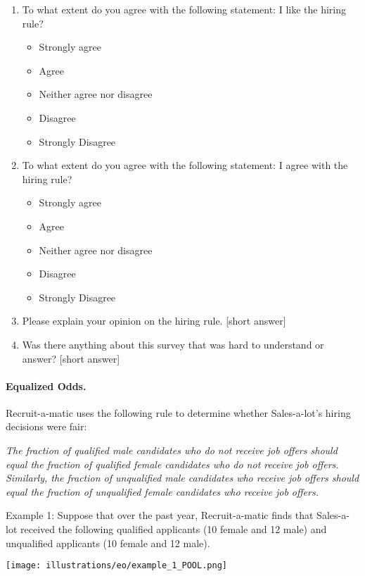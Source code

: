 \documentclass{article}
\begin{document}
\begin{enumerate}
\item To what extent do you agree with the following statement: I like the hiring rule?
\begin{itemize}
    \item Strongly agree
    \item Agree
    \item Neither agree nor disagree
    \item Disagree
    \item Strongly Disagree
\end{itemize}

\item To what extent do you agree with the following statement: I agree with the hiring rule?
\begin{itemize}
    \item Strongly agree
    \item Agree
    \item Neither agree nor disagree
    \item Disagree
    \item Strongly Disagree
\end{itemize}

\item Please explain your opinion on the hiring rule. [short answer]

\item Was there anything about this survey that was hard to understand or answer? [short answer]

\end{enumerate}

\paragraph{Equalized Odds.}
Recruit-a-matic uses the following rule to determine whether Sales-a-lot’s hiring decisions were fair:
 
\emph{The fraction of qualified male candidates who do not receive job offers should equal the fraction of qualified female candidates who do not receive job offers. Similarly, the fraction of unqualified male candidates who receive job offers should equal the fraction of unqualified female candidates who receive job offers.}

Example 1: Suppose that over the past year, Recruit-a-matic finds that Sales-a-lot received the following qualified applicants (10 female and 12 male) and unqualified applicants (10 female and 12 male).

\texttt{[image: illustrations/eo/example\_1\_POOL.png]}
\end{document}
